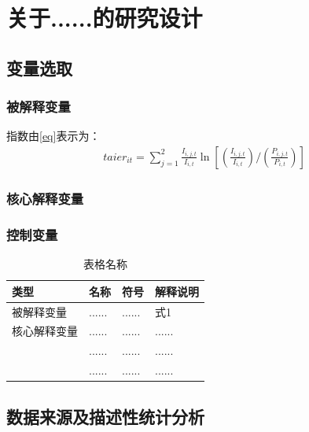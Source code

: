 \chapter{关于......的研究设计}
\section{变量选取}
\subsection{被解释变量}
指数由\ref{eq}表示为：
\begin{align}
taier_{it}=\sum_{j = 1}^{2}\frac{I_{i,j,t}}{I_{i,t}}\ln\left[\left(\frac{I_{i,j,t}}{I_{i,t}}\right)/\left(\frac{P_{i,j,t}}{P_{i,t}}\right)\right]\label{eq}
\end{align}



\subsection{核心解释变量}

\subsection{控制变量}

\begin{table}[htbp]
\centering
\caption{表格名称}
\label{tab:}
\begin{tabular}{>{\centering\arraybackslash}m{2.5cm}>{\centering\arraybackslash}m{3cm}>{\centering\arraybackslash}m{3cm}>{\centering\arraybackslash}m{5.5cm}}
\toprule
\textbf{类型} & \textbf{名称} & \textbf{符号} & \textbf{解释说明} \\
\midrule
被解释变量 & ...... & ...... & 式1\\
核心解释变量 & ......& ...... & ......\\
\multirow{2}{*}{控制变量} 
& ...... & ...... & ......\\
& ...... & ...... & ......\\

\bottomrule
\end{tabular}
\end{table}


\section{数据来源及描述性统计分析}
